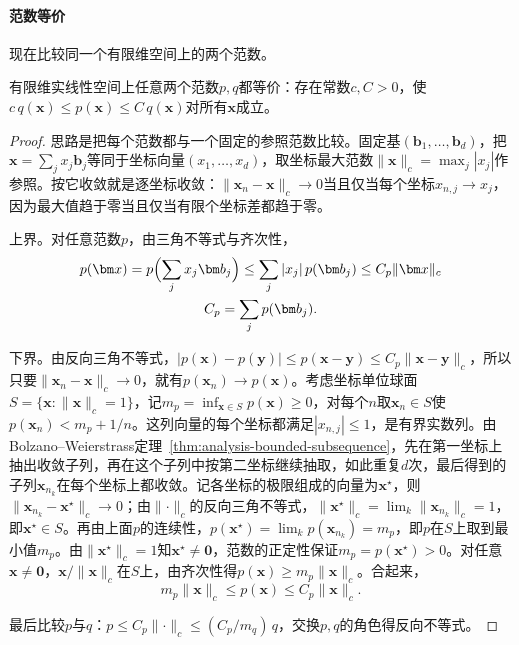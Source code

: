 \paragraph{范数等价}
现在比较同一个有限维空间上的两个范数。
\begin{theorem}[有限维范数等价]
\label{thm:ls-norm-equivalence}
有限维实线性空间上任意两个范数$p,q$都等价：存在常数$c,C>0$，使$c\,q(\bm x)\leq p(\bm x)\leq C\,q(\bm x)$对所有$\bm x$成立。
\end{theorem}
\begin{proof}
思路是把每个范数都与一个固定的参照范数比较。固定基$(\bm b_1,\ldots,\bm b_d)$，把$\bm x=\sum_jx_j\bm b_j$等同于坐标向量$(x_1,\ldots,x_d)$，取坐标最大范数$\lVert\bm x\rVert_c=\max_j|x_j|$作参照。按它收敛就是逐坐标收敛：$\lVert\bm x_n-\bm x\rVert_c\to0$当且仅当每个坐标$x_{n,j}\to x_j$，因为最大值趋于零当且仅当有限个坐标差都趋于零。

上界。对任意范数$p$，由三角不等式与齐次性，
\[
 \begin{gathered}
p(\bm x)=p\Bigl(\sum_jx_j\bm b_j\Bigr)\leq\sum_j|x_j|\,p(\bm b_j)\leq C_p\lVert\bm x\rVert_c\\
C_p=\sum_jp(\bm b_j).
 \end{gathered}
\]

下界。由反向三角不等式，$|p(\bm x)-p(\bm y)|\leq p(\bm x-\bm y)\leq C_p\lVert\bm x-\bm y\rVert_c$，所以只要$\lVert\bm x_n-\bm x\rVert_c\to0$，就有$p(\bm x_n)\to p(\bm x)$。考虑坐标单位球面$S=\{\bm x:\lVert\bm x\rVert_c=1\}$，记$m_p=\inf_{\bm x\in S}p(\bm x)\geq0$，对每个$n$取$\bm x_n\in S$使$p(\bm x_n)<m_p+1/n$。这列向量的每个坐标都满足$|x_{n,j}|\leq1$，是有界实数列。由Bolzano--Weierstrass定理~\ref{thm:analysis-bounded-subsequence}，先在第一坐标上抽出收敛子列，再在这个子列中按第二坐标继续抽取，如此重复$d$次，最后得到的子列$\bm x_{n_k}$在每个坐标上都收敛。记各坐标的极限组成的向量为$\bm x^\star$，则$\lVert\bm x_{n_k}-\bm x^\star\rVert_c\to0$；由$\lVert\cdot\rVert_c$的反向三角不等式，$\lVert\bm x^\star\rVert_c=\lim_k\lVert\bm x_{n_k}\rVert_c=1$，即$\bm x^\star\in S$。再由上面$p$的连续性，\label{thm:ls-extreme-value}$p(\bm x^\star)=\lim_kp(\bm x_{n_k})=m_p$，即$p$在$S$上取到最小值$m_p$。由$\lVert\bm x^\star\rVert_c=1$知$\bm x^\star\neq\bm0$，范数的正定性保证$m_p=p(\bm x^\star)>0$。对任意$\bm x\neq\bm0$，$\bm x/\lVert\bm x\rVert_c$在$S$上，由齐次性得$p(\bm x)\geq m_p\lVert\bm x\rVert_c$。合起来，
\begin{equation}
 m_p\lVert\bm x\rVert_c\leq p(\bm x)\leq C_p\lVert\bm x\rVert_c.
 \label{eq:linear-algebra-finite-norm-equivalence}
\end{equation}

最后比较$p$与$q$：$p\leq C_p\lVert\cdot\rVert_c\leq(C_p/m_q)\,q$，交换$p,q$的角色得反向不等式。
\end{proof}
